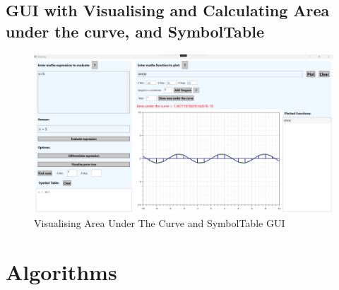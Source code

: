\documentclass[a4paper, oneside, 11pt]{report}
\begin{document}
\section{GUI with Visualising and Calculating Area under the curve, and SymbolTable}
\begin{figure}[H]
\begin{center}
\includegraphics[scale=0.4]{LastSprintGUI.png}
\caption{Visualising Area Under The Curve and SymbolTable GUI}
\label{basicgui}
\end{center}
\end{figure}
\chapter{Algorithms}
\label{app:algorithms}
\end{document}
